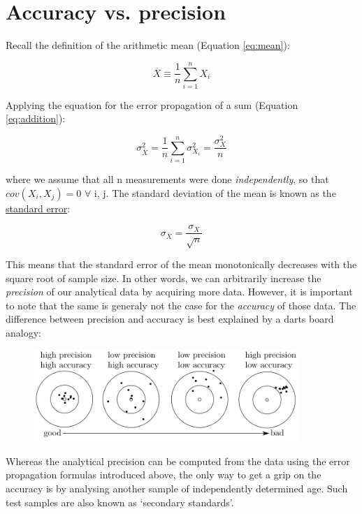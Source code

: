 \documentclass{book}
\newif\ifpdf
\begin{document}
\section{Accuracy vs. precision}

Recall the definition of the arithmetic mean (Equation \ref{eq:mean}):

$$\overline{X} \equiv \frac{1}{n} \sum_{i=1}^{n} X_i$$

Applying the equation for the error propagation of a sum (Equation
\ref{eq:addition}):

\begin{equation}
\sigma_{\overline{X}}^2 = \frac{1}{n} \sum_{i=1}^{n} \sigma^2_{X_i} = \frac{\sigma^2_X}{n}
\label{eq:varianceofthemean}
\end{equation}

where we assume that all n measurements were done
\emph{independently}, so that $cov(X_i,X_j)=0$ $\forall$ i, j.  The
standard deviation of the mean is known as the \underline{standard error}:

\begin{equation}
\sigma_{\overline{X}} = \frac{\sigma_X}{\sqrt{n}}
\label{eq:standarderror}
\end{equation}

This means that the standard error of the mean monotonically decreases
with the square root of sample size. In other words, we can
arbitrarily increase the \emph{precision} of our analytical data by
acquiring more data. However, it is important to note that the same is
generaly not the case for the \emph{accuracy} of those data. The
difference between precision and accuracy is best explained by a darts
board analogy:

\begin{figure}[!ht]
  \centering
  \ifpdf
  \def\svgwidth{\textwidth}
  
  \else
  \includegraphics[width=10cm]{bullseye.png}
  \fi
\end{figure}

Whereas the analytical precision can be computed from the data using
the error propagation formulas introduced above, the only way to get a
grip on the accuracy is by analysing another sample of independently
determined age. Such test samples are also known as `secondary
standards'.
\end{document}
